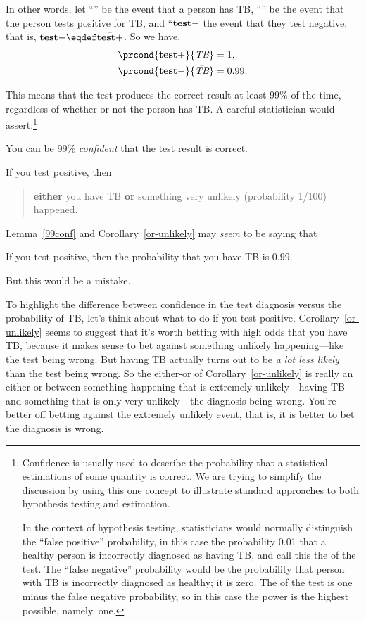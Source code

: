 In other words, let ``\TB'' be the event that a person
has TB, ``\testplus'' be the event that the person tests
positive for TB, and ``$\mathbf{test-}$ the event that they test negative,
that is, $\testminus \eqdef \bar{\testplus}$.  So we have,
\begin{align}
\prcond{\testplus}{\TB} & = 1,\label{pr+TB}\\
\prcond{\testminus}{\bar{\TB}} & = 0.99.\label{pr-barTB}
\end{align}

This means that the test produces the correct result at least 99\% of
the time, regardless of whether or not the person has TB.  A careful
statistician would assert:\footnote{Confidence is usually used to
  describe the probability that a statistical estimations of some
  quantity is correct.  We are trying to simplify the discussion by
  using this one concept to illustrate standard approaches to both
  hypothesis testing and estimation.

  In the context of hypothesis testing, statisticians would normally
  distinguish the ``false positive'' probability, in this case the
  probability 0.01 that a healthy person is incorrectly diagnosed as
  having TB, and call this the  of the test.  The
  ``false negative'' probability would be the probability that person
  with TB is incorrectly diagnosed as healthy; it is zero.  The
   of the test is one minus the false negative
  probability, so in this case the power is the highest possible,
  namely, one.}

\begin{lemma*}\label{99conf}
You can be 99\% \emph{confident} that the test result is correct.
\end{lemma*}
\begin{corollary}\label{or-unlikely}
If you test positive, then
\begin{quote}
\textbf{either} you have TB \textbf{or} something very unlikely
(probability 1/100) happened.
\end{quote}
\end{corollary}
Lemma~\ref{99conf} and Corollary~\ref{or-unlikely} may \emph{seem} to
be saying that
\begin{falseclm*}
If you test positive, then the probability that you have TB is $0.99$.
\end{falseclm*}
But this would be a mistake.

To highlight the difference between confidence in the test diagnosis
versus the probability of TB, let's think about what to do if you test
positive.  Corollary~\ref{or-unlikely} seems to suggest that it's
worth betting with high odds that you have TB, because it makes sense
to bet against something unlikely happening---like the test being
wrong.  But having TB actually turns out to be \emph{a lot less
  likely} than the test being wrong.  So the either-or of
Corollary~\ref{or-unlikely} is really an either-or between something
happening that is extremely unlikely---having TB---and something that
is only very unlikely---the diagnosis being wrong.  You're better off
betting against the extremely unlikely event, that is, it is better to
bet the diagnosis is wrong.

